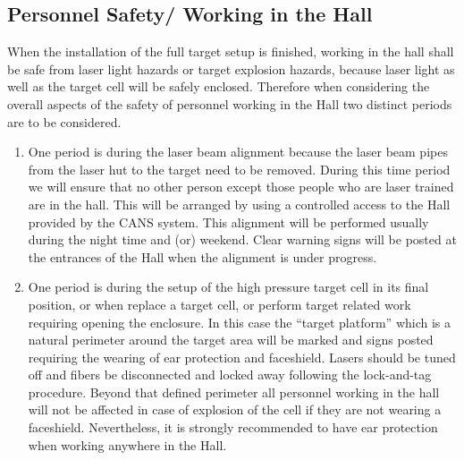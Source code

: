 \begin{safetyen}{10}{5}
\subsection{Personnel Safety/ Working in the Hall}
\label{sec:prs}

When the installation of the full target setup is finished, working in
the hall
shall be safe from laser light hazards or target explosion hazards,
because 
laser light as  well as the target cell will be safely enclosed.
Therefore 
when considering the overall aspects of the safety of personnel working
in the
Hall two distinct periods are to be considered.

\begin{enumerate}

\item One period is during the laser beam alignment because the laser
beam pipes
from the laser hut to the  target need to be removed. During this time
period we
will ensure that no other person except those people who are laser
trained are in the hall. This will be arranged by using a
controlled access 
to the Hall provided by the CANS system.
This alignment 
will be performed usually during the night time and (or) weekend. 
Clear warning signs will
be posted  at the
entrances of the Hall when the alignment is under progress.

\item One period is during the setup of the high pressure target cell in
its final position, or when replace a target cell, or perform target related 
work requiring opening the enclosure.
In this case the ``target platform'' which is a natural perimeter around
the target area 
 will be marked  and signs posted requiring the wearing of ear
protection and
faceshield. Lasers should be tuned off and fibers be disconnected and locked 
away following the lock-and-tag procedure.
Beyond that defined perimeter all personnel working in the
hall
will not be affected in case of explosion of the cell if they are not 
wearing  a faceshield. Nevertheless, it is strongly recommended to have 
ear protection when working anywhere in the Hall. 
\end{enumerate}
\end{safetyen}

